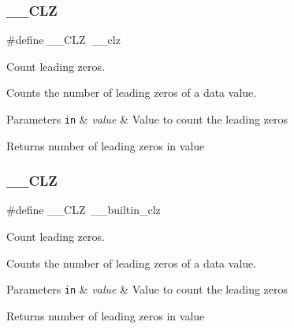 \subsubsection{\texorpdfstring{\+\_\+\+\_\+\+C\+LZ}{\_\_CLZ}\hspace{0.1cm}{\footnotesize\ttfamily [1/3]}}
{\footnotesize\ttfamily \#define \+\_\+\+\_\+\+C\+LZ~\+\_\+\+\_\+clz}



Count leading zeros. 

Counts the number of leading zeros of a data value. 
\begin{DoxyParams}[1]{Parameters}
\mbox{\tt in}  & {\em value} & Value to count the leading zeros \\
\hline
\end{DoxyParams}
\begin{DoxyReturn}{Returns}
number of leading zeros in value 
\end{DoxyReturn}
\mbox{\label{group___c_m_s_i_s___core___instruction_interface_ga5d5bb1527e042be4a9fa5a33f65cc248}} 
\subsubsection{\texorpdfstring{\+\_\+\+\_\+\+C\+LZ}{\_\_CLZ}\hspace{0.1cm}{\footnotesize\ttfamily [2/3]}}
{\footnotesize\ttfamily \#define \+\_\+\+\_\+\+C\+LZ~\+\_\+\+\_\+builtin\+\_\+clz}



Count leading zeros. 

Counts the number of leading zeros of a data value. 
\begin{DoxyParams}[1]{Parameters}
\mbox{\tt in}  & {\em value} & Value to count the leading zeros \\
\hline
\end{DoxyParams}
\begin{DoxyReturn}{Returns}
number of leading zeros in value 
\end{DoxyReturn}
\mbox{\label{group___c_m_s_i_s___core___instruction_interface_ga5d5bb1527e042be4a9fa5a33f65cc248}} 
